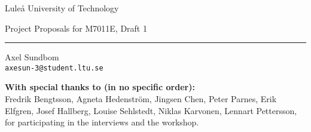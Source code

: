 \centering

{\Huge Luleå University of Technology}\par
\vspace{1ex}
{\Large Project Proposals for M7011E, Draft 1}\par
\rule{.5\textwidth}{.4pt}



\vspace{4ex}
\begin{minipage}{.3\textwidth}
\centering
Axel Sundbom\\
\texttt{axesun-3@student.ltu.se}
\end{minipage}

\vfill
\begin{abstract}
\noindent This document describes some programming project assignments for the course M7011E that came out of a fifth year project for computer engineering students. Most of these assignments are results of interviews with examiners and suggestions from a workshop that was held as a part of the pre-study. You may redistribute this document under the terms and agreements of the MIT license.
\end{abstract}

\tableofcontents
\vfill
\textbf{With special thanks to (in no specific order):}\\
Fredrik Bengtsson, Agneta Hedenström, Jingsen Chen, Peter Parnes, Erik Elfgren, Josef Hallberg, Louise Sehlstedt, Niklas Karvonen, Lennart Pettersson, for participating in the interviews and the workshop.

